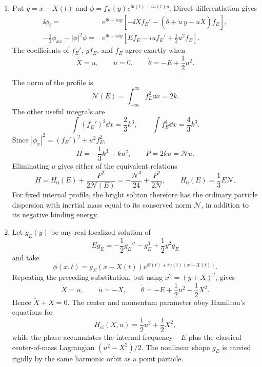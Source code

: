 \begin{enumerate}
\begin{enumerate}
    \item[(ii)]
    Put \(y=x-X(t)\) and
    \(\phi=f_E(y)e^{\ii\theta(t)+iu(t)y}\).  Direct differentiation gives
    \[
    \begin{split}
      \ii\phi_t={}&e^{\ii\theta+iuy}
       \left[-\ii\dot X f_E'
        -(\dot\theta+\dot u\,y-u\dot X)f_E\right],\\
      -\frac12\phi_{xx}-|\phi|^2\phi
        ={}&e^{\ii\theta+iuy}
       \left[Ef_E-iu f_E'+\frac12u^2f_E\right].
    \end{split}
    \]
    The coefficients of \(f_E'\), \(yf_E\), and \(f_E\) agree exactly
    when
    \[
      \boxed{\dot X=u,\qquad\dot u=0,\qquad
        \dot\theta=-E+\frac12u^2.}
    \]

    The norm of the profile is
    \[
      \mathcal N(E)=\int_{-\infty}^{\infty}f_E^2\dd x=2k.
    \]
    The other useful integrals are
    \[
      \int(f_E')^2\dd x=\frac23k^3,
      \qquad
      \int f_E^4\dd x=\frac43k^3.
    \]
    Since \(|\phi_x|^2=(f_E')^2+u^2f_E^2\),
    \[
      \boxed{H=-\frac13k^3+ku^2,
      \qquad P=2ku=\mathcal N u.}
    \]
    Eliminating \(u\) gives either of the equivalent relations
    \[
      \boxed{H=H_0(E)+\frac{P^2}{2\mathcal N(E)}
        =-\frac{\mathcal N^3}{24}
          +\frac{P^2}{2\mathcal N},
      \qquad H_0(E)=\frac13E\mathcal N.}
    \]
    For fixed internal profile, the bright soliton therefore has the
    ordinary particle dispersion with inertial mass equal to its conserved
    norm \(\mathcal N\), in addition to its negative binding energy.

    \item[(iii)]
    Let \(g_E(y)\) be any real localized solution of
    \[
      Eg_E=-\frac12g_E''-g_E^3+\frac12y^2g_E
    \]
    and take
    \[
      \phi(x,t)=g_E(x-X(t))
        e^{\ii\theta(t)+iu(t)(x-X(t))}.
    \]
    Repeating the preceding substitution, but using
    \(x^2=(y+X)^2\), gives
    \[
      \boxed{\dot X=u,\qquad
        \dot u=-X,\qquad
        \dot\theta=-E+\frac12u^2-\frac12X^2.}
    \]
    Hence \(\ddot X+X=0\).  The center and momentum parameter obey
    Hamilton's equations for
    \[
      H_{\mathrm{cl}}(X,u)=\frac12u^2+\frac12X^2,
    \]
    while the phase accumulates the internal frequency \(-E\) plus the
    classical center-of-mass Lagrangian
    \((u^2-X^2)/2\).  The nonlinear shape \(g_E\) is carried rigidly by
    the same harmonic orbit as a point particle.


\end{enumerate}
\end{enumerate}
